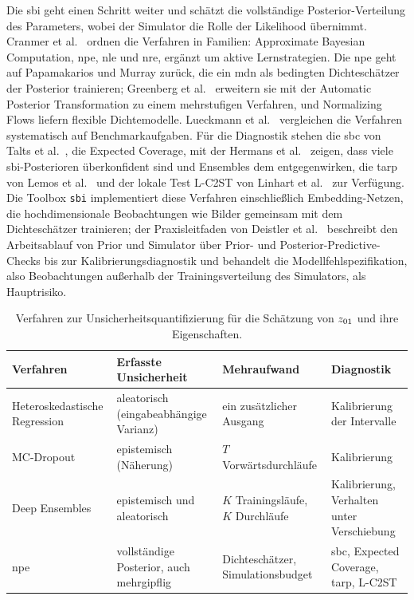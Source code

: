 Die \ac{sbi} geht einen Schritt weiter und schätzt die vollständige
Posterior-Verteilung des Parameters, wobei der Simulator die Rolle der
Likelihood übernimmt. Cranmer et al.\ \cite{cranmer2020frontier} ordnen die Verfahren in
Familien: Approximate Bayesian Computation, \ac{npe}, \ac{nle} und
\ac{nre}, ergänzt um aktive Lernstrategien. Die \ac{npe} geht auf
Papamakarios und Murray \cite{papamakarios2016fast} zurück, die ein \ac{mdn} als bedingten
Dichteschätzer der Posterior trainieren; Greenberg et al.\ \cite{greenberg2019apt}
erweitern
sie mit der Automatic Posterior Transformation zu einem mehrstufigen
Verfahren, und Normalizing Flows
\cite{rezende2015variational,papamakarios2021flows} liefern flexible
Dichtemodelle. Lueckmann et al.\ \cite{lueckmann2021benchmarking} vergleichen die Verfahren
systematisch auf Benchmarkaufgaben. Für die Diagnostik stehen die
\ac{sbc} von Talts et al.\ \cite{talts2018sbc}, die Expected Coverage, mit der
Hermans et al.\ \cite{hermans2022trust} zeigen, dass viele \ac{sbi}-Posterioren
überkonfident sind und Ensembles dem entgegenwirken, die \ac{tarp} von
Lemos et al.\ \cite{lemos2023tarp} und der lokale Test L-C2ST von
Linhart et al.\ \cite{linhart2023lc2st} zur Verfügung. Die Toolbox \texttt{sbi}
\cite{tejerocantero2020sbi,boelts2025sbireloaded} implementiert diese
Verfahren einschließlich Embedding-Netzen, die hochdimensionale
Beobachtungen wie Bilder gemeinsam mit dem Dichteschätzer trainieren; der
Praxisleitfaden von Deistler et al.\ \cite{deistler2025sbi} beschreibt den Arbeitsablauf
von Prior und Simulator über Prior- und Posterior-Predictive-Checks bis zur
Kalibrierungsdiagnostik und behandelt die Modellfehlspezifikation, also
Beobachtungen außerhalb der Trainingsverteilung des Simulators, als
Hauptrisiko.

\begin{table}[tb]
  \centering
  \caption[Verfahren zur Unsicherheitsquantifizierung im Vergleich]{%
    Verfahren zur Unsicherheitsquantifizierung für die Schätzung von $\zOne$
    und ihre Eigenschaften.}
  \label{tab:stand:unsicherheit}
  \footnotesize
  \begin{tabular}{@{}L{3.8cm} L{3.3cm} L{2.8cm} L{3.4cm}@{}}
    \toprule
    Verfahren & Erfasste Unsicherheit & Mehraufwand & Diagnostik \\
    \midrule
    Heteroskedastische Regression \cite{nix1994estimating,kendall2017uncertainties} & aleatorisch (eingabeabhängige Varianz) & ein zusätzlicher Ausgang & Kalibrierung der Intervalle \\
    \addlinespace
    MC-Dropout \cite{gal2016dropout} & epistemisch (Näherung) & $T$ Vorwärtsdurchläufe & Kalibrierung \\
    \addlinespace
    Deep Ensembles \cite{lakshminarayanan2017ensembles} & epistemisch und aleatorisch & $K$ Trainingsläufe, $K$ Durchläufe & Kalibrierung, Verhalten unter Verschiebung \\
    \addlinespace
    \acs{npe} \cite{papamakarios2016fast,greenberg2019apt} & vollständige Posterior, auch mehrgipflig & Dichteschätzer, Simulationsbudget & \acs{sbc}, Expected Coverage, \acs{tarp}, L-C2ST \\
    \bottomrule
  \end{tabular}
\end{table}

